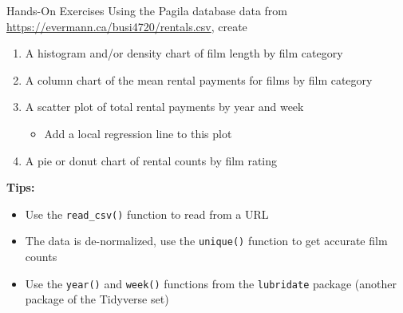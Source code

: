 \documentclass[ignorenonframetext,xcolor=x11names]{beamer}
\begin{document}
\begin{frame}{Hands-On Exercises}
\footnotesize
Using the Pagila database data from \url{https://evermann.ca/busi4720/rentals.csv}, create
\begin{enumerate}
   \item A histogram and/or density chart of film length by film category
   \item A column chart of the mean rental payments for films by film category
   \item A scatter plot of total rental payments by year and week
   \begin{itemize}
	  \footnotesize
      \item Add a local regression line to this plot
   \end{itemize}
   \item A pie or donut chart of rental counts by film rating
\end{enumerate}
\textbf{Tips:}
\begin{itemize}
\item Use the \texttt{read\_csv()} function to read from a URL
\item The data is de-normalized, use the \texttt{unique()} function to get accurate film counts
\item Use the \texttt{year()} and \texttt{week()} functions from the \texttt{lubridate} package (another package of the Tidyverse set)
\end{itemize}
\end{frame}
\end{document}
